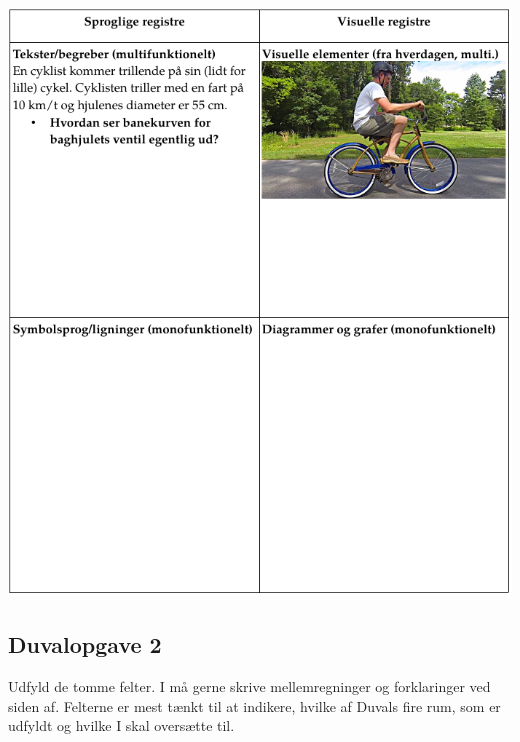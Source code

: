 \documentclass[a4paper, 12pt]{article}
\begin{document}
\begin{center}
\includegraphics[width=.9\linewidth]{img/duvalopgave_1.png}
\end{center}


\newpage

\subsection*{Duvalopgave 2}
\label{sec:orgb07fc2a}

Udfyld de tomme felter. I må gerne skrive mellemregninger og forklaringer ved siden af. Felterne er mest tænkt til at indikere, hvilke af Duvals fire rum, som er udfyldt og hvilke I skal oversætte til.
\end{document}
